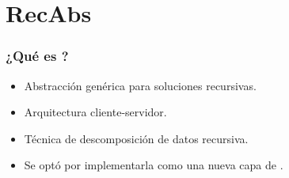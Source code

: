 \section{RecAbs}

\begin{frame}\frametitle{¿Qué es \rc?}
    \begin{itemize}
        \item   Abstracción genérica para soluciones recursivas.
        \item   Arquitectura cliente-servidor.
        \item   Técnica de descomposición de datos recursiva.
        \pause
        \item   Se optó por implementarla como una nueva capa de \fud{}.
    \end{itemize}

    \begin{center}
    \end{center}
\end{frame}


